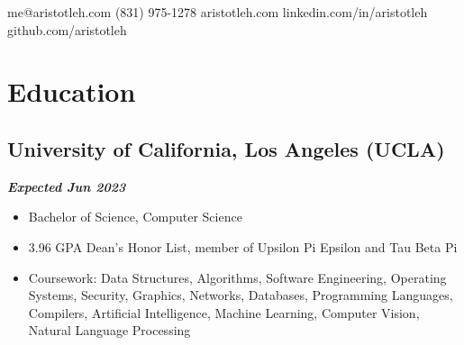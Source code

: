 \documentclass[10pt]{article}
\begin{document}
    \begin{raggedright}

    \thispagestyle{empty}


    \titlespacing*{\section}{-4pt}{6pt}{3pt}
    \titlespacing*{\subsection}{0pt}{4pt}{0pt}

    \begin{center}
        \openup 6pt

        {\fontsize{28pt}{14pt}\selectfont{\bfseries\sffamily Aristotle Henderson}}

        me@aristotleh.com {\textbar} (831) 975-1278 {\textbar} aristotleh.com {\textbar} linkedin.com/in/aristotleh {\textbar} github.com/aristotleh
    \end{center}

    \section*{Education}

        \subsection*{\textbf{\large{University of California, Los Angeles (UCLA)}}} \hfill \textbf{\textit{Expected Jun 2023}}
        \begin{itemize}
            \item Bachelor of Science, Computer Science
            \item 3.96 GPA \textendash{} Dean's Honor List, member of Upsilon Pi Epsilon and Tau Beta Pi
            \item Coursework: Data Structures, Algorithms, Software Engineering, Operating Systems, Security, Graphics, Networks, Databases, Programming Languages, Compilers, Artificial Intelligence, Machine Learning, Computer Vision, Natural Language Processing
        \end{itemize}


\end{raggedright}
\end{document}
